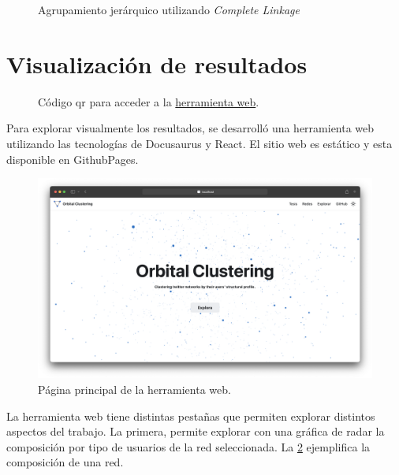  \begin{figure}[htbp]
   \centering
   
    \caption{Agrupamiento jerárquico utilizando \textit{Complete Linkage}}
    \label{fig:dendro-complete}
\end{figure}

\section{Visualización de resultados}

 \begin{figure}[htbp]
   \centering
   
    \caption{Código qr para acceder a la \href{https://roicort.github.io/OrbitalClustering}{herramienta web}.}
    \label{img:web-comp}
\end{figure}

Para explorar visualmente los resultados, se desarrolló una herramienta web utilizando las tecnologías de Docusaurus y React. 
El sitio web es estático y esta disponible en GithubPages. 

 \begin{figure}
   \centering
   \includegraphics[width=1\textwidth]{images/web-main.png}
    \caption{Página principal de la herramienta web.}
    \label{img:web-main}
\end{figure}

La herramienta web tiene distintas pestañas que permiten explorar distintos aspectos del trabajo. La primera, permite explorar con una gráfica de radar la composición por tipo de usuarios de la red seleccionada. La \ref{img:web-comp} ejemplifica la composición de una red.

